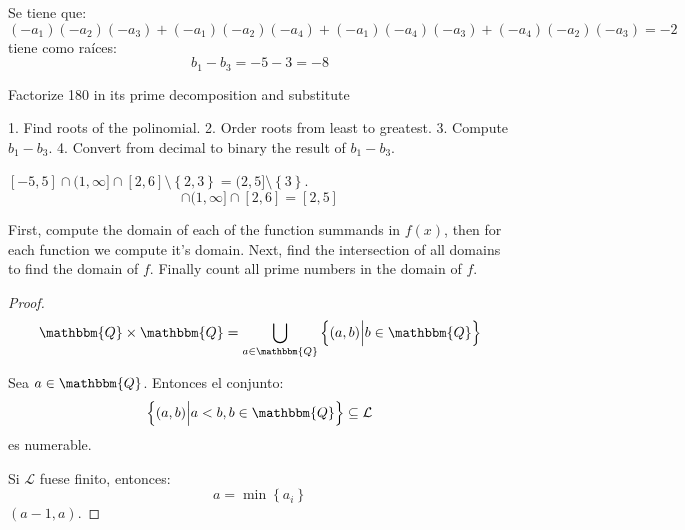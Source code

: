 \documentclass[12pt]{report}
\newcounter{it}
\theoremstyle{largebreak}
\newcommand{\bbm}[1]{\ensuremath{\mathbbm{#1}}}
\begin{document}
    \begin{sol}
        Se tiene que:
        \begin{equation*}
            (-a_1)(-a_2)(-a_3)+(-a_1)(-a_2)(-a_4)+(-a_1)(-a_4)(-a_3)+(-a_4)(-a_2)(-a_3)=-2
        \end{equation*}
        tiene como raíces:
        \begin{equation*}
            b_1-b_3=-5-3=-8
        \end{equation*}

        Factorize 180 in its prime decomposition and substitute 

        1. Find roots of the polinomial.
        2. Order roots from least to greatest.
        3. Compute $b_1-b_3$.
        4. Convert from decimal to binary the result of $b_1-b_3$.

    \end{sol}

    \begin{sol}
        $[-5,5]\cap (1,\infty]\cap[2,6]\setminus\left\{2,3 \right\}=(2,5]\setminus\left\{3\right\}$.
        \begin{equation*}
            [-5,5]\cap (1,\infty]\cap[2,6]=[2,5]
        \end{equation*}
    \end{sol}

    First, compute the domain of each of the function summands in $f(x)$, then for each function we compute it's domain. Next, find the intersection of all domains to find the domain of $f$. Finally count all prime numbers in the domain of $f$.

    \begin{proof}
        \begin{equation*}
            \begin{split}
                \bbm{Q}\times\bbm{Q}&=\bigcup_{ a\in\bbm{Q}}\left\{(a,b)\Big|b\in\bbm{Q} \right\}\\
            \end{split}
        \end{equation*}

        Sea $a\in\bbm{Q}$. Entonces el conjunto:
        \begin{equation*}
            \left\{(a,b)\Big|a<b,b\in\bbm{Q} \right\}\subseteq\mathcal{L}
        \end{equation*}
        es numerable.

        Si $\mathcal{L}$ fuese finito, entonces:
        \begin{equation*}
            a=\min\left\{a_i \right\}
        \end{equation*}
        $(a-1,a)$.
    \end{proof}
\end{document}
